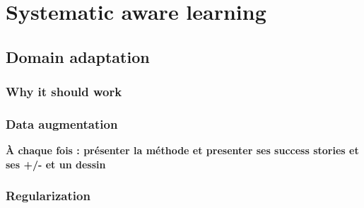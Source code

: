 
\chapter{Systematic aware learning}  %
\label{chap:sota}

\ifpdf
    \graphicspath{{Chapter2/Figs/Raster/}{Chapter2/Figs/PDF/}{Chapter2/Figs/}}
\else
    \graphicspath{{Chapter2/Figs/Vector/}{Chapter2/Figs/}}
\fi





\section{Domain adaptation} %
\label{sec:domain_adaptation}


\subsection{Why it should work} %
\label{sub:why_it_should_work}







\subsection{Data augmentation} %
\label{sub:data_augmentation}




\textbf{À chaque fois : présenter la méthode et presenter ses success stories et ses +/- et un dessin}




\subsection{Regularization} %
\label{sub:regularization}

